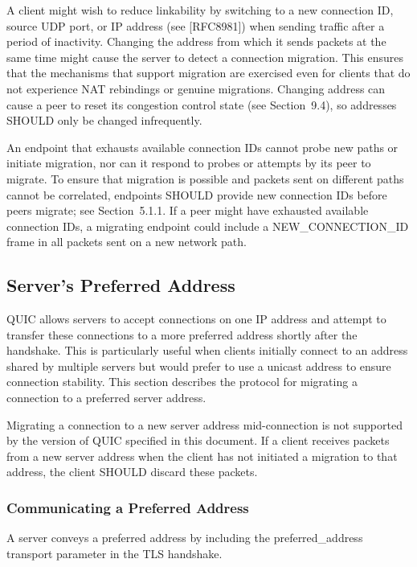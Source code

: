 \documentclass{article}
\begin{document}
A client might wish to reduce linkability by switching to a new connection ID, source UDP port, or IP address (see [RFC8981]) when sending traffic after a period of inactivity.  Changing the address from which it sends packets at the same time might cause the server to detect a connection migration.  This ensures that the mechanisms that support migration are exercised even for clients that do not experience NAT rebindings or genuine migrations.  Changing address can cause a peer to reset its congestion control state (see Section~9.4), so addresses SHOULD only be changed infrequently.

An endpoint that exhausts available connection IDs cannot probe new paths or initiate migration, nor can it respond to probes or attempts by its peer to migrate.  To ensure that migration is possible and packets sent on different paths cannot be correlated, endpoints SHOULD provide new connection IDs before peers migrate; see Section~5.1.1.  If a peer might have exhausted available connection IDs, a migrating endpoint could include a NEW\_CONNECTION\_ID frame in all packets sent on a new network path.

\subsection{Server's Preferred Address}

QUIC allows servers to accept connections on one IP address and attempt to transfer these connections to a more preferred address shortly after the handshake.  This is particularly useful when clients initially connect to an address shared by multiple servers but would prefer to use a unicast address to ensure connection stability.  This section describes the protocol for migrating a connection to a preferred server address.

Migrating a connection to a new server address mid-connection is not supported by the version of QUIC specified in this document.  If a client receives packets from a new server address when the client has not initiated a migration to that address, the client SHOULD discard these packets.

\subsubsection{Communicating a Preferred Address}

A server conveys a preferred address by including the preferred\_address transport parameter in the TLS handshake.
\end{document}
